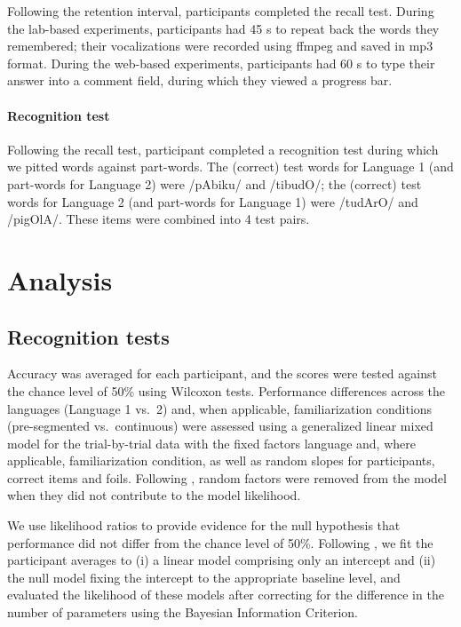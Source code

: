 \documentclass[]{article}
\let\oldparagraph\paragraph
\renewcommand{\paragraph}[1]{\oldparagraph{#1}\mbox{}}
\newcommand{\appsection}[1]{
  \clearpage
  \section{#1}
  \setcounter{subsection}{0}%
}
\begin{document}
Following the retention interval, participants completed the recall test. During the lab-based experiments, participants had 45 s to repeat back the words they remembered; their vocalizations were recorded using ffmpeg and saved in mp3 format. During the web-based experiments, participants had 60 s to type their answer into a comment field, during which they viewed a progress bar.

\paragraph{Recognition test}\label{recognition-test}

Following the recall test, participant completed a recognition test during which we pitted words against part-words. The (correct) test words for Language 1 (and part-words for Language 2) were /pAbiku/ and /tibudO/; the (correct) test words for Language 2 (and part-words for Language 1) were /tudArO/ and /pigOlA/. These items were combined into 4 test pairs.

\appsection{Analysis}\label{app:analysis}

\subsection{Recognition tests}\label{recognition-tests}

Accuracy was averaged for each participant, and the scores were tested against the chance level of 50\% using Wilcoxon tests. Performance differences across the languages (Language 1 vs.~2) and, when applicable, familiarization conditions (pre-segmented vs.~continuous) were assessed using a generalized linear mixed model for the trial-by-trial data with the fixed factors language and, where applicable, familiarization condition, as well as random slopes for participants, correct items and foils. Following \citep{Baayen2008}, random factors were removed from the model when they did not contribute to the model likelihood.

We use likelihood ratios to provide evidence for the null hypothesis that performance did not differ from the chance level of 50\%. Following \citep{Glover2004}, we fit the participant averages to (i) a linear model comprising only an intercept and (ii) the null model fixing the intercept to the appropriate baseline level, and evaluated the likelihood of these models after correcting for the difference in the number of parameters using the Bayesian Information Criterion.
\end{document}
